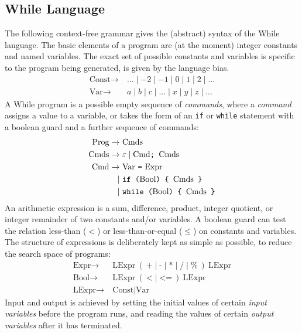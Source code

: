 \documentclass[a4paper,twoside,notitlepage]{article}
\newcommand{\ttt}{\texttt}
\newcommand{\trm}{\textrm}
\begin{document}
\subsection{While Language} \label{sec:outlng}

The following context-free grammar gives the (abstract) syntax of the While 
language. The basic elements of a program are (at the moment) integer 
constants and named variables. The exact set of possible constants and 
variables is specific to the program being generated, is given by the language 
bias.
\begin{align*}
   \trm{Const} \to\ & ... \mid -2 \mid -1 \mid 0 \mid 1 \mid 2 \mid ...
\\ \trm{Var}   \to\ & a \mid b \mid c \mid ... \mid x \mid y \mid z \mid ...
\end{align*}
A While program is a possible empty sequence of \emph{commands}, where a 
\emph{command} assigns a value to a variable, or takes the form of an \ttt{if} 
or \ttt{while} statement with a boolean guard and a further sequence of 
commands:
\begin{align*}
   \trm{Prog}  \to\ & \trm{Cmds}
\\ \trm{Cmds}  \to\ & \varepsilon \mid \trm{Cmd} \ttt{; } \trm{Cmds}
\\ \trm{Cmd}   \to\ & \trm{Var} \ \ttt{=} \ \trm{Expr}
\\            \mid\ & \ttt{if (} \trm{Bool} \ttt{) \char`\{\ } \trm{Cmds} \ttt{ \char`\}}
\\            \mid\ & \ttt{while (} \trm{Bool} \ttt{) \char`\{\ } \trm{Cmds} \ttt{ \char`\}}
\end{align*}
An arithmetic expression is a sum, difference, product, integer quotient, or 
integer remainder of two constants and/or variables. A boolean guard can test 
the relation less-than ($<$) or less-than-or-equal ($\leq$) on constants and 
variables. The structure of expressions is deliberately kept as simple as 
possible, to reduce the search space of programs:
\begin{align*}
   \trm{Expr}  \to\ & \trm{LExpr}\ (\ \ttt{+} \mid \ttt{-} \mid \ttt{*} \mid
                                      \ttt{/} \mid \ttt{\%} \ )\ \trm{LExpr}
\\ \trm{Bool}  \to\ & \trm{LExpr}\ (\ \ttt{<} \mid \ttt{<=}\ )\ \trm{LExpr}
\\ \trm{LExpr} \to\ & \trm{Const} \mid \trm{Var}
\end{align*}
Input and output is achieved by setting the initial values of certain 
\emph{input variables} before the program runs, and reading the values of 
certain \emph{output variables} after it has terminated.
\end{document}
